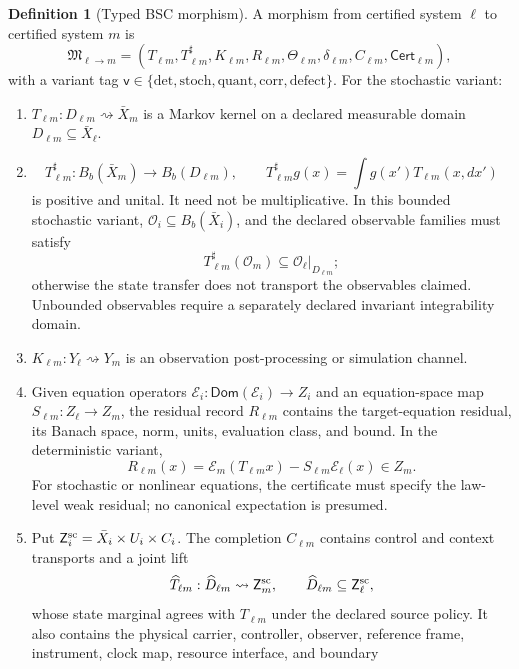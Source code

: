 \documentclass[11pt,a4paper]{article}
\theoremstyle{definition}
\newtheorem{definition}{Definition}[section]
\theoremstyle{plain}
\theoremstyle{remark}
\newcommand{\Obs}{\mathcal O}
\newcommand{\Cert}{\mathsf{Cert}}
\begin{document}
\begin{definition}[Typed BSC morphism]\label{def:morphism}
A morphism from certified system \(\ell\) to certified system \(m\) is
\begin{equation}\label{eq:morphism}
\mathfrak M_{\ell\to m}=
\left(
T_{\ell m},T_{\ell m}^{\sharp},K_{\ell m},R_{\ell m},
\Theta_{\ell m},\delta_{\ell m},C_{\ell m},\Cert_{\ell m}
\right),
\end{equation}
with a variant tag \(\mathsf v\in\{\mathrm{det},\mathrm{stoch},
\mathrm{quant},\mathrm{corr},\mathrm{defect}\}\).  For the stochastic variant:
\begin{enumerate}
\item \(T_{\ell m}:D_{\ell m}\rightsquigarrow\bar X_m\) is a Markov kernel on a
declared measurable domain \(D_{\ell m}\subseteq\bar X_\ell\).
\item
\[
T_{\ell m}^{\sharp}:B_b(\bar X_m)\to B_b(D_{\ell m}),\qquad
T_{\ell m}^{\sharp}g(x)=\int g(x')T_{\ell m}(x,dx')
\]
is positive and unital.  It need not be multiplicative.  In this bounded
stochastic variant, \(\Obs_i\subseteq B_b(\bar X_i)\), and the declared
observable families must satisfy
\[
T_{\ell m}^{\sharp}(\Obs_m)
\subseteq \Obs_\ell|_{D_{\ell m}} ;
\]
otherwise the state transfer does not transport the observables claimed.
Unbounded observables require a separately declared invariant integrability
domain.
\item \(K_{\ell m}:Y_\ell\rightsquigarrow Y_m\) is an observation
post-processing or simulation channel.
\item Given equation operators
\(\mathcal E_i:\mathsf{Dom}(\mathcal E_i)\to Z_i\) and an equation-space map
\(S_{\ell m}:Z_\ell\to Z_m\), the residual record \(R_{\ell m}\) contains
the target-equation residual, its Banach space, norm, units, evaluation class,
and bound.  In the deterministic variant,
\[
R_{\ell m}(x)=
\mathcal E_m(T_{\ell m}x)-S_{\ell m}\mathcal E_\ell(x)\in Z_m.
\]
For stochastic or nonlinear equations, the certificate must specify the
law-level weak residual; no canonical expectation is presumed.
\item Put
\(\mathsf Z_i^{\rm sc}=\bar X_i\times U_i\times C_i\).  The completion
\(C_{\ell m}\) contains control and context transports and a joint lift
\[
\widehat T_{\ell m}:
\widehat D_{\ell m}\rightsquigarrow\mathsf Z_m^{\rm sc},
\qquad
\widehat D_{\ell m}\subseteq\mathsf Z_\ell^{\rm sc},
\]
whose state marginal agrees with \(T_{\ell m}\) under the declared source
policy.  It also contains the physical carrier, controller, observer,
reference frame, instrument, clock map, resource interface, and boundary

\end{enumerate}
\end{definition}
\end{document}
